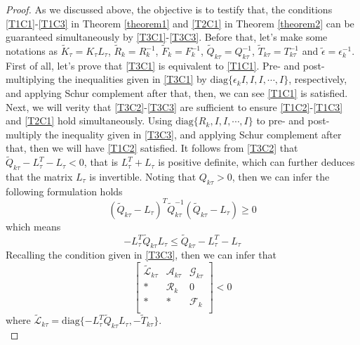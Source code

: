 \documentclass[journal,final,twocolumn]{IEEEtran}
\begin{document}
\begin{proof}
	As we discussed above, the objective is to testify that, the conditions \eqref{T1C1}-\eqref{T1C3} in Theorem \ref{theorem1} and \eqref{T2C1} in Theorem \ref{theorem2}  can be guaranteed simultaneously by \eqref{T3C1}-\eqref{T3C3}. Before that, let's make some notations as $\tilde{K}_{\tau }=K_{\tau }L_{\tau }$, $\tilde{R}_{k}=R^{-1}_{k}$, $\tilde{F}_{k}=F^{-1}_{k}$, $\tilde{Q}_{k\tau }=Q^{-1}_{k\tau }$, $\tilde{T}_{k\tau }=T^{-1}_{k\tau }$ and  $\tilde{\epsilon}=\epsilon^{-1}_{k}$. 
	First of all, let's prove that \eqref{T3C1} is equivalent to \eqref{T1C1}. Pre- and post- multiplying the inequalities given in \eqref{T3C1} by $\mathrm{diag}\{\epsilon_{k}I, I,I,\cdots,I \}$, respectively, and applying  Schur complement after that, then, we can see \eqref{T1C1} is satisfied.  
	Next, we will verity that \eqref{T3C2}-\eqref{T3C3} are sufficient  to ensure \eqref{T1C2}-\eqref{T1C3} and \eqref{T2C1} hold simultaneously.  Using $\mathrm{diag}\{R_{k}, I ,I,\cdots, I \}$  to pre- and post-multiply the inequality given in \eqref{T3C3}, and applying Schur complement after that, then we will have \eqref{T1C2} satisfied.  
	It follows from  \eqref{T3C2} that $\tilde{Q}_{k\tau}-L^{T}_{\tau }-L_{\tau }<0$, that is $L^{T}_{\tau }+L_{\tau } $ is positive definite, which can further deduces that the matrix  $L_{\tau }$ is invertible. Noting that $Q_{k\tau}>0$, then we can infer the following formulation holds
	\begin{equation}
		(\tilde{Q}_{k\tau} - L_{\tau } )^{T}\tilde{Q}^{-1}_{k\tau }(\tilde{Q}_{k\tau} - L_{\tau } )\geq 0
	\end{equation}
	which means 
	\begin{equation}
		-L^{T}_{\tau }\tilde{Q}_{k\tau }L_{\tau } \leq  \tilde{Q}_{k\tau}-L^{T}_{\tau }-L_{\tau }
	\end{equation}
	Recalling the condition given in \eqref{T3C3}, then we can infer that
	 \begin{equation} \label{ls2}
	 	\begin{bmatrix}
	 	\tilde{\mathscr{L}}_{k\tau }&\mathscr{A}_{k\tau }&\mathscr{G}_{k\tau }\\
	 	*&\mathscr{R}_{k}&0\\
	 	*&*&\mathscr{F}_{k}\\
	 	\end{bmatrix}<0
	 \end{equation}
	 where $\tilde{\mathscr{L}}_{k\tau }= \mathrm{diag}\{-L^{T}_{\tau }\tilde{Q}_{k\tau }L_{\tau },  -\tilde{T}_{k\tau } \}$. \\

\end{proof}
\end{document}
